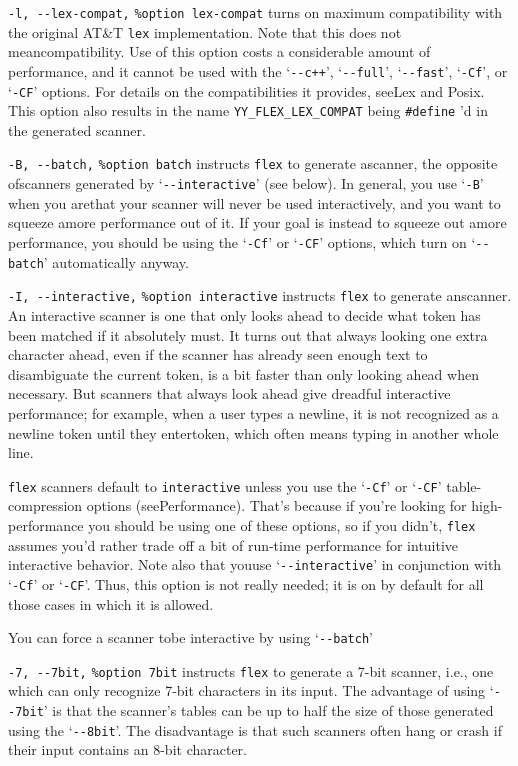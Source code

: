 \documentclass[openany,oneside]{book}
\begin{document}
\verb`-l, --lex-compat,` \verb`%option lex-compat` turns on maximum compatibility with the original AT\&{}T \verb`lex` implementation.  Note that this does not meancompatibility. 
Use of this option costs a considerable amount of performance, and it
cannot be used with the ‘\verb`--c++`’, ‘\verb`--full`’, ‘\verb`--fast`’, ‘\verb`-Cf`’, or
‘\verb`-CF`’ options.  For details on the compatibilities it provides, seeLex and Posix.  This option also results in the name \verb`YY_FLEX_LEX_COMPAT` being \verb`#define` 'd in the generated scanner.

\verb`-B, --batch,` \verb`%option batch` instructs \verb`flex` to generate ascanner, the opposite ofscanners generated by ‘\verb`--interactive`’ (see below).  In
general, you use ‘\verb`-B`’ when you arethat your scanner
will never be used interactively, and you want to squeeze amore performance out of it.  If your goal is instead to
squeeze out amore performance, you should be using the
‘\verb`-Cf`’ or ‘\verb`-CF`’ options, which turn on ‘\verb`--batch`’ automatically
anyway.

\verb`-I, --interactive,` \verb`%option interactive` instructs \verb`flex` to generate anscanner.  An
interactive scanner is one that only looks ahead to decide what token
has been matched if it absolutely must.  It turns out that always
looking one extra character ahead, even if the scanner has already seen
enough text to disambiguate the current token, is a bit faster than only
looking ahead when necessary.  But scanners that always look ahead give
dreadful interactive performance; for example, when a user types a
newline, it is not recognized as a newline token until they entertoken, which often means typing in another whole line.

 \verb`flex` scanners default to \verb`interactive` unless you use the
‘\verb`-Cf`’ or ‘\verb`-CF`’ table-compression options
(seePerformance).  That's because if you're looking for
high-performance you should be using one of these options, so if you
didn't, \verb`flex` assumes you'd rather trade off a bit of run-time
performance for intuitive interactive behavior.  Note also that youuse ‘\verb`--interactive`’ in conjunction with ‘\verb`-Cf`’ or
‘\verb`-CF`’.  Thus, this option is not really needed; it is on by default
for all those cases in which it is allowed.

You can force a scanner tobe interactive by using
‘\verb`--batch`’

\verb`-7, --7bit,` \verb`%option 7bit` instructs \verb`flex` to generate a 7-bit scanner, i.e., one which can
only recognize 7-bit characters in its input.  The advantage of using
‘\verb`--7bit`’ is that the scanner's tables can be up to half the size of
those generated using the ‘\verb`--8bit`’.  The disadvantage is that such
scanners often hang or crash if their input contains an 8-bit character.
\end{document}
